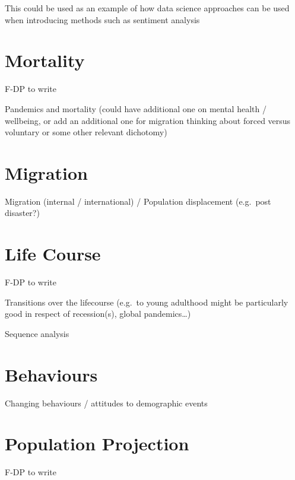 \documentclass[
]{book}
\begin{document}
This could be used as an example of how data science approaches can be used when introducing methods such as sentiment analysis

\hypertarget{mortality}{%
\chapter{Mortality}\label{mortality}}

F-DP to write

Pandemics and mortality (could have additional one on mental health / wellbeing, or add an additional one for migration thinking about forced versus voluntary or some other relevant dichotomy)

\hypertarget{migration}{%
\chapter{Migration}\label{migration}}

Migration (internal / international) / Population displacement (e.g.~post disaster?)

\hypertarget{life-course}{%
\chapter{Life Course}\label{life-course}}

F-DP to write

Transitions over the lifecourse (e.g.~to young adulthood might be particularly good in respect of recession(s), global pandemics\ldots)

Sequence analysis

\hypertarget{behaviours}{%
\chapter{Behaviours}\label{behaviours}}

Changing behaviours / attitudes to demographic events

\hypertarget{population-projection}{%
\chapter{Population Projection}\label{population-projection}}

F-DP to write

  
\end{document}
